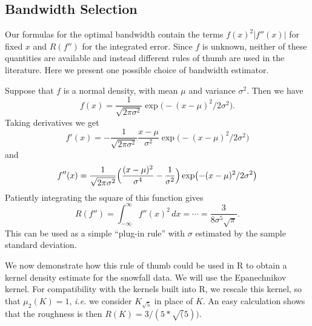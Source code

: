 \documentclass[
  a4paper,
]{article}
\theoremstyle{definition}
\theoremstyle{definition}
\theoremstyle{definition}
\theoremstyle{definition}
\theoremstyle{remark}
\begin{document}
\subsection{Bandwidth Selection}\label{bwsel}

Our formulas for the optimal bandwidth contain the terms
\(f(x)^2 |f''(x)|\) for fixed \(x\) and \(R(f'')\) for the integrated error.
Since \(f\) is unknown, neither of these quantities are available and instead
different rules of thumb are used in the literature. Here we present
one possible choice of bandwidth estimator.

Suppose that \(f\) is a normal density, with mean \(\mu\) and variance \(\sigma^2\).
Then we have
\begin{equation*}
  f(x)
  = \frac{1}{\sqrt{2\pi\sigma^2}} \exp\bigl( - (x-\mu)^2 / 2\sigma^2 \bigr).
\end{equation*}
Taking derivatives we get
\begin{equation*}
  f'(x)
  = - \frac{1}{\sqrt{2\pi\sigma^2}} \frac{x-\mu}{\sigma^2} \exp\bigl( - (x-\mu)^2 / 2\sigma^2 \bigr)
\end{equation*}
and
\begin{equation*}
  f''(x)
  = \frac{1}{\sqrt{2\pi\sigma^2}}
      \Bigl( \frac{(x-\mu)^2}{\sigma^4} - \frac{1}{\sigma^2} \Bigr)
      \exp\bigl( - (x-\mu)^2 / 2\sigma^2 \bigr)
\end{equation*}
Patiently integrating the square of this function gives
\begin{equation*}
  R(f'')
  = \int_{-\infty}^\infty f''(x)^2 \,dx
  = \cdots
  = \frac{3}{8\sigma^5\sqrt{\pi}}.
\end{equation*}
This can be used as a simple ``plug-in rule'' with \(\sigma\) estimated by the
sample standard deviation.

We now demonstrate how this rule of thumb could be used in R to obtain a kernel
density estimate for the snowfall data. We will use the Epanechnikov kernel.
For compatibility with the kernels built into R, we rescale this kernel, so
that \(\mu_2(K) = 1\), \emph{i.e.} we consider \(K_{\sqrt{5}}\) in place of \(K\). An easy
calculation shows that the roughness is then \(R(K) = 3 / (5*\sqrt(5))\).
\end{document}
